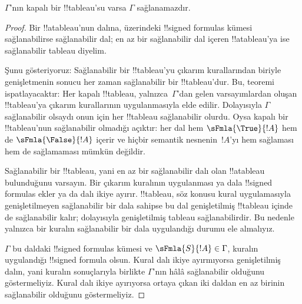 \begin{thm}[Sağlamlık]
  $\Gamma$'nın kapalı bir !!{tableau}'su varsa $\Gamma$ sağlanamazdır.
\end{thm}

\begin{proof}
Bir !!a{tableau}'nun dalına, üzerindeki !!{signed formula}s kümesi
sağlanabilirse sağlanabilir dal; en az bir sağlanabilir dal içeren
!!a{tableau}'ya ise sağlanabilir tableau diyelim.

Şunu gösteriyoruz: Sağlanabilir bir !!{tableau}'yu çıkarım kurallarından
biriyle genişletmenin sonucu her zaman sağlanabilir bir !!{tableau}'dur. Bu,
teoremi ispatlayacaktır: Her kapalı !!{tableau}, yalnızca~$\Gamma$'dan gelen
varsayımlardan oluşan !!{tableau}'ya çıkarım kurallarının uygulanmasıyla elde
edilir. Dolayısıyla $\Gamma$ sağlanabilir olsaydı onun için her !!{tableau}
sağlanabilir olurdu. Oysa kapalı bir !!{tableau}'nun sağlanabilir olmadığı
açıktır: her dal hem $\sFmla{\True}{!A}$ hem de $\sFmla{\False}{!A}$ içerir
ve hiçbir semantik nesnenin~$!A$'yı hem sağlaması hem de sağlamaması mümkün değildir.

Sağlanabilir bir !!{tableau}, yani en az bir sağlanabilir dalı olan
!!a{tableau} bulunduğunu varsayın. Bir çıkarım kuralının uygulanması ya dala
!!{signed formula}s ekler ya da dalı ikiye ayırır. !!{tableau}, söz konusu
kural uygulamasıyla genişletilmeyen sağlanabilir bir dala sahipse bu dal
genişletilmiş !!{tableau} içinde de sağlanabilir kalır; dolayısıyla
genişletilmiş tableau sağlanabilirdir. Bu nedenle yalnızca bir kuralın
sağlanabilir bir dala uygulandığı durumu ele almalıyız.

$\Gamma$ bu daldaki !!{signed formula}s kümesi ve
$\sFmla{S}{!A} \in \Gamma$, kuralın uygulandığı !!{signed formula} olsun.
Kural dalı ikiye ayırmıyorsa genişletilmiş dalın, yani kuralın sonuçlarıyla
birlikte $\Gamma$'nın hâlâ sağlanabilir olduğunu göstermeliyiz. Kural dalı
ikiye ayırıyorsa ortaya çıkan iki daldan en az birinin sağlanabilir olduğunu
göstermeliyiz.
  

\end{proof}
